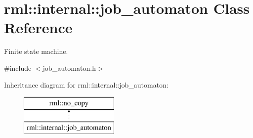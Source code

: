 \hypertarget{classrml_1_1internal_1_1job__automaton}{}\section{rml\+:\+:internal\+:\+:job\+\_\+automaton Class Reference}
\label{classrml_1_1internal_1_1job__automaton}


Finite state machine.  




{\ttfamily \#include $<$job\+\_\+automaton.\+h$>$}

Inheritance diagram for rml\+:\+:internal\+:\+:job\+\_\+automaton\+:\begin{figure}[H]
\begin{center}
\leavevmode
\includegraphics[height=2.000000cm]{classrml_1_1internal_1_1job__automaton}
\end{center}
\end{figure}
